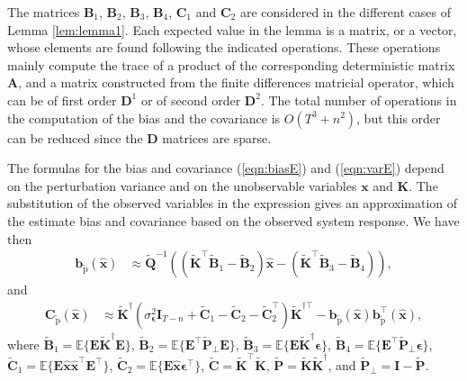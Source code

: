 The matrices $\mathbf{B}_1$, $\mathbf{B}_2$, $\mathbf{B}_3$, $\mathbf{B}_4$, $\mathbf{C}_1$ and $\mathbf{C}_2$ are considered in the different cases of Lemma \ref{lem:lemma1}.
Each expected value in the lemma is a matrix, or a vector, whose elements are found following the indicated operations.
These operations mainly compute the trace of a product of the corresponding deterministic matrix $\mathbf{A}$, and a matrix constructed from the finite differences matricial operator, which can be of first order $\mathbf{D}^{1}$ or of second order $\mathbf{D}^{2}$.
The total number of operations in the computation of the bias and the covariance is $O\left( T^3 + n^2 \right)$, but this order can be reduced since the $\mathbf{D}$ matrices are sparse.

The formulas for the bias and covariance (\ref{eqn:biasE}) and (\ref{eqn:varE}) depend on the perturbation variance and on the unobservable variables $\mathbf{x}$ and $\mathbf{K}$.
The substitution of the observed variables in the expression gives an approximation of the estimate bias and covariance based on the observed system response.
We have then
\begin{equation} \begin{aligned} \mathbf{b}_{\widetilde{\mathrm{p}}} \left( \widehat{\mathbf{x}} \right) & \approx \widetilde{\mathbf{Q}}^{-1} \left( \left( \widetilde{\mathbf{K}}^\top \widetilde{\mathbf{B}}_1 - \widetilde{\mathbf{B}}_2 \right) \widehat{\mathbf{x}} - \left( \widetilde{\mathbf{K}}^\top \widetilde{\mathbf{B}}_3 - \widetilde{\mathbf{B}}_4 \right) \right), \end{aligned} \label{eqn:biasST} \end{equation}
and
\begin{equation} \begin{aligned} \mathbf{C}_{\widetilde{\mathrm{p}}} \left( \widehat{\mathbf{x}} \right) & \approx \widetilde{\mathbf{K}}^\dagger \left( \sigma_{\bm{\epsilon}}^2 \mathbf{I}_{T-n} + \widetilde{\mathbf{C}}_1 - \widetilde{\mathbf{C}}_2 - \widetilde{\mathbf{C}}_2^\top \right) \widetilde{\mathbf{K}}^{\dagger \top} - \mathbf{b}_{\widetilde{\mathrm{p}}} \left( \widehat{\mathbf{x}} \right) \mathbf{b}_{\widetilde{\mathrm{p}}}^\top \left( \widehat{\mathbf{x}} \right) , \end{aligned} \label{eqn:varST} \end{equation}
where $\widetilde{\mathbf{B}}_1 = \mathbb{E} \Big\{ \mathbf{E} \widetilde{\mathbf{K}}^\dagger \mathbf{E} \Big\}$, $\widetilde{\mathbf{B}}_2 = \mathbb{E} \Big\{ \mathbf{E}^\top \widetilde{\mathbf{P}}_\perp \mathbf{E} \Big\}$, $\widetilde{\mathbf{B}}_3 = \mathbb{E} \Big\{ \mathbf{E} \widetilde{\mathbf{K}}^\dagger \bm{\epsilon} \Big\}$, $\widetilde{\mathbf{B}}_4 = \mathbb{E} \Big\{ \mathbf{E}^\top \widetilde{\mathbf{P}}_\perp \bm{\epsilon} \Big\}$, $\widetilde{\mathbf{C}}_1 = \mathbb{E} \Big\{ \mathbf{E} \widehat{\mathbf{x}} \widehat{\mathbf{x}}^\top \mathbf{E}^\top \Big\}$, $\widetilde{\mathbf{C}}_2 = \mathbb{E} \Big\{ \mathbf{E} \widehat{\mathbf{x}} \bm{\epsilon}^\top \Big\}$, $\widetilde{\mathbf{C}} = \widetilde{\mathbf{K}}^\top \widetilde{\mathbf{K}}$, $\widetilde{\mathbf{P}} = \widetilde{\mathbf{K}} \widetilde{\mathbf{K}}^\dagger$, and $\widetilde{\mathbf{P}}_\perp = \mathbf{I} - \widetilde{\mathbf{P}}$.

